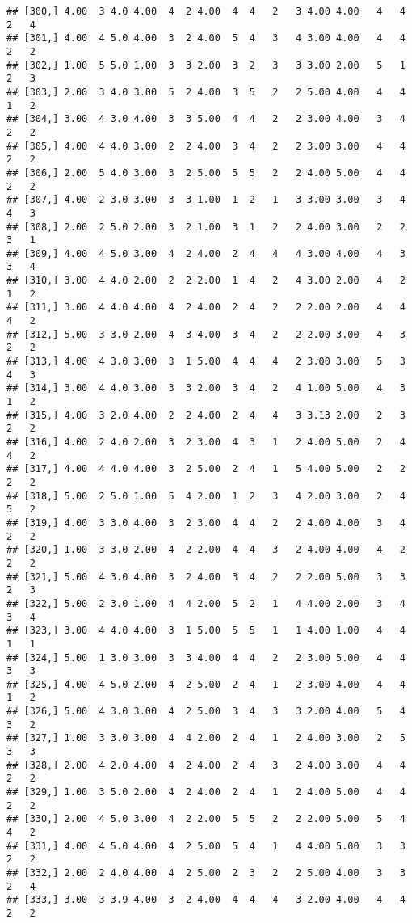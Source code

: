 \documentclass[]{article}
\begin{document}
\begin{verbatim}
## [300,] 4.00  3 4.0 4.00  4  2 4.00  4  4   2   3 4.00 4.00   4   4   2   4
## [301,] 4.00  4 5.0 4.00  3  2 4.00  5  4   3   4 3.00 4.00   4   4   2   2
## [302,] 1.00  5 5.0 1.00  3  3 2.00  3  2   3   3 3.00 2.00   5   1   2   3
## [303,] 2.00  3 4.0 3.00  5  2 4.00  3  5   2   2 5.00 4.00   4   4   1   2
## [304,] 3.00  4 3.0 4.00  3  3 5.00  4  4   2   2 3.00 4.00   3   4   2   2
## [305,] 4.00  4 4.0 3.00  2  2 4.00  3  4   2   2 3.00 3.00   4   4   2   2
## [306,] 2.00  5 4.0 3.00  3  2 5.00  5  5   2   2 4.00 5.00   4   4   2   2
## [307,] 4.00  2 3.0 3.00  3  3 1.00  1  2   1   3 3.00 3.00   3   4   4   3
## [308,] 2.00  2 5.0 2.00  3  2 1.00  3  1   2   2 4.00 3.00   2   2   3   1
## [309,] 4.00  4 5.0 3.00  4  2 4.00  2  4   4   4 3.00 4.00   4   3   3   4
## [310,] 3.00  4 4.0 2.00  2  2 2.00  1  4   2   4 3.00 2.00   4   2   1   2
## [311,] 3.00  4 4.0 4.00  4  2 4.00  2  4   2   2 2.00 2.00   4   4   4   2
## [312,] 5.00  3 3.0 2.00  4  3 4.00  3  4   2   2 2.00 3.00   4   3   2   2
## [313,] 4.00  4 3.0 3.00  3  1 5.00  4  4   4   2 3.00 3.00   5   3   4   3
## [314,] 3.00  4 4.0 3.00  3  3 2.00  3  4   2   4 1.00 5.00   4   3   1   2
## [315,] 4.00  3 2.0 4.00  2  2 4.00  2  4   4   3 3.13 2.00   2   3   2   2
## [316,] 4.00  2 4.0 2.00  3  2 3.00  4  3   1   2 4.00 5.00   2   4   4   2
## [317,] 4.00  4 4.0 4.00  3  2 5.00  2  4   1   5 4.00 5.00   2   2   2   2
## [318,] 5.00  2 5.0 1.00  5  4 2.00  1  2   3   4 2.00 3.00   2   4   5   2
## [319,] 4.00  3 3.0 4.00  3  2 3.00  4  4   2   2 4.00 4.00   3   4   2   2
## [320,] 1.00  3 3.0 2.00  4  2 2.00  4  4   3   2 4.00 4.00   4   2   2   2
## [321,] 5.00  4 3.0 4.00  3  2 4.00  3  4   2   2 2.00 5.00   3   3   2   3
## [322,] 5.00  2 3.0 1.00  4  4 2.00  5  2   1   4 4.00 2.00   3   4   3   4
## [323,] 3.00  4 4.0 4.00  3  1 5.00  5  5   1   1 4.00 1.00   4   4   1   1
## [324,] 5.00  1 3.0 3.00  3  3 4.00  4  4   2   2 3.00 5.00   4   4   3   3
## [325,] 4.00  4 5.0 2.00  4  2 5.00  2  4   1   2 3.00 4.00   4   4   1   2
## [326,] 5.00  4 3.0 3.00  4  2 5.00  3  4   3   3 2.00 4.00   5   4   3   2
## [327,] 1.00  3 3.0 3.00  4  4 2.00  2  4   1   2 4.00 3.00   2   5   3   3
## [328,] 2.00  4 2.0 4.00  4  2 4.00  2  4   3   2 4.00 3.00   4   4   2   2
## [329,] 1.00  3 5.0 2.00  4  2 4.00  2  4   1   2 4.00 5.00   4   4   2   2
## [330,] 2.00  4 5.0 3.00  4  2 2.00  5  5   2   2 2.00 5.00   5   4   4   2
## [331,] 4.00  4 5.0 4.00  4  2 5.00  5  4   1   4 4.00 5.00   3   3   2   2
## [332,] 2.00  2 4.0 4.00  4  2 5.00  2  3   2   2 5.00 4.00   3   3   2   4
## [333,] 3.00  3 3.9 4.00  3  2 4.00  4  4   4   3 2.00 4.00   4   4   2   2

\end{verbatim}
\end{document}
